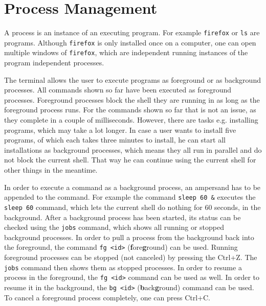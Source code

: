 \section{Process Management}

A process is an instance of an executing program. For example \lstinline{firefox} or \lstinline{ls} are programs. Although \lstinline{firefox} is only installed once on a computer, one can open multiple windows of \lstinline{firefox}, which are independent running instances of the program \textendash{} independent processes.

The terminal allows the user to execute programs as foreground or as background processes. All commands shown so far have been executed as foreground processes. Foreground processes block the shell they are running in as long as the foreground process runs. For the commands shown so far that is not an issue, as they complete in a couple of milliseconds. However, there are tasks e.g. installing programs, which may take a lot longer. In case a user wants to install five programs, of which each takes three minutes to install, he can start all installations as background processes, which means they all run in parallel and do not block the current shell. That way he can continue using the current shell for other things in the meantime.

In order to execute a command as a background process, an ampersand has to be appended to the command. For example the command \lstinline{sleep 60 &} executes the \lstinline{sleep 60} command, which lets the current shell do nothing for 60 seconds, in the background. After a background process has been started, its status can be checked using the \lstinline{jobs} command, which shows all running or stopped background processes. In order to pull a process from the background back into the foreground, the command \lstinline{fg <id>} (\textbf{f}ore\textbf{g}round) can be used. Running foreground processes can be stopped (not canceled) by pressing the Ctrl+Z. The \lstinline{jobs} command then shows them as stopped processes. In order to resume a process in the foreground, the \lstinline{fg <id>} command can be used as well. In order to resume it in the background, the \lstinline{bg <id>} (\textbf{b}ack\textbf{g}round) command can be used. To cancel a foreground process completely, one can press Ctrl+C.
